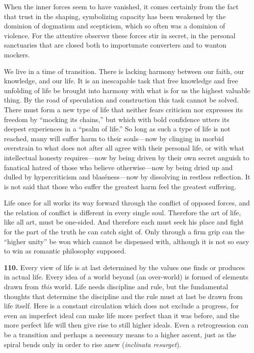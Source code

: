 \documentclass[12pt,a4paper]{book}
\newcommand{\opage}[1]{\marginnote{\footnotesize\textit{[#1]}}}
\begin{document}
When the inner forces seem to have vanished, it comes certainly from the fact that trust in the shaping,
symbolizing capacity has been weakened by the dominion of dogmatism and scepticism, which so often was a
dominion of violence. For the attentive observer these forces stir in secret, in the personal sanctuaries that
are closed both to importunate converters and to wanton mockers.

We live in a time of transition. There is lacking harmony between our faith, our knowledge, and our life. It is
an inescapable task that free knowledge and free unfolding of life be brought into harmony with what is for us
the highest valuable thing. By the road of speculation and construction this task cannot be solved. There must
form a new type of life that neither fears criticism nor expresses its freedom by ``mocking its chains,'' but
which with bold confidence utters its deepest experiences in a ``psalm of life.'' So long as such a type of life
is not reached, many will suffer harm to their souls---now by clinging in morbid overstrain to what does not
after all agree with their personal life, or with what intellectual honesty requires---now by being driven by
their own secret anguish to fanatical hatred of those who believe otherwise---now by being 
\opage{242}dried up and dulled
by hypercriticism and blaséness---now by dissolving in restless reflection. It is not said that those who suffer
the greatest harm feel the greatest suffering.

Life once for all works its way forward through the conflict of opposed forces, and the relation of conflict is
different in every single soul. Therefore the art of life, like all art, must be one-sided. And therefore each
must seek his place and fight for the part of the truth he can catch sight of. Only through a firm grip can the
``higher unity'' be won which cannot be dispensed with, although it is not so easy to win as romantic philosophy
supposed.

\medskip

\noindent\textbf{110.} Every view of life is at last determined by the values one finds or produces in actual
life. Every idea of a world beyond (an over-world) is formed of elements drawn from \emph{this} world. Life
needs discipline and rule, but the fundamental thoughts that determine the discipline and the rule must at last
be drawn from life itself. Here is a constant circulation which does not exclude a progress, for even an
imperfect ideal can make life more perfect than it was before, and the more perfect life will then give rise to
still higher ideals. Even a retrogression can be a transition and perhaps a necessary means to a higher
ascent, just as the spiral bends only in order to rise anew (\textit{inclinata resurget}).
\end{document}
